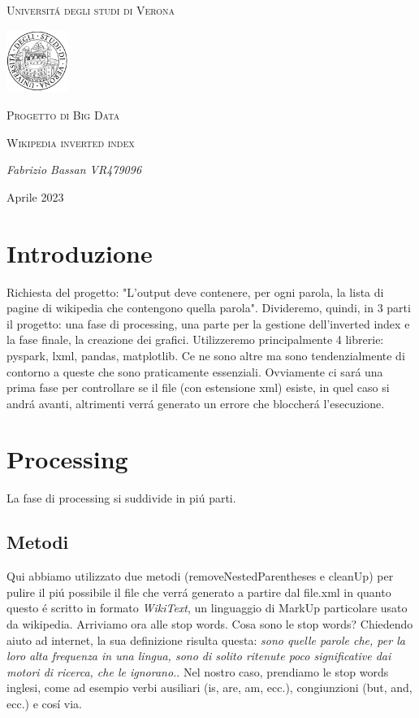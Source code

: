 \documentclass[12pt,a4paper]{article}
\begin{document}
    \begin{titlepage}
    	\centering
        {\textsc{Universitá degli studi di Verona} \par}
        \par\vspace{1cm}
    	\includegraphics[width=0.15\textwidth]{logoUni.png}
        \par
    	\vspace{1cm}
    	{\Large \textsc{Progetto di Big Data}\par}
    	\vspace{1cm}
        {\Large \textsc{Wikipedia inverted index}\par}
    	\vspace{5cm}
    	{\Large\itshape Fabrizio Bassan VR479096\par}
    	\vfill
    	{\large Aprile 2023 \par}
    \end{titlepage}
    
    \tableofcontents
    \newpage
    \section{Introduzione}
    Richiesta del progetto: "L’output deve contenere, per ogni parola, la lista di pagine di wikipedia che contengono quella parola".
    Divideremo, quindi, in 3 parti il progetto: una fase di processing, una parte per la gestione dell'inverted index e la fase finale, la creazione dei grafici.
    Utilizzeremo principalmente 4 librerie: pyspark, lxml, pandas, matplotlib.
    Ce ne sono altre ma sono tendenzialmente di contorno a queste che sono praticamente essenziali.
    \newline
    Ovviamente ci sará una prima fase per controllare se il file (con estensione xml) esiste, in quel caso si andrá avanti, altrimenti verrá generato un errore che bloccherá l'esecuzione.
    \section{Processing}
    La fase di processing si suddivide in piú parti.
    \subsection{Metodi}
    Qui abbiamo utilizzato due metodi (removeNestedParentheses e cleanUp) per pulire il piú possibile il file che verrá generato a partire dal file.xml in quanto questo é scritto in formato \textit{WikiText}, un linguaggio di MarkUp particolare usato da wikipedia. Arriviamo ora alle stop words. Cosa sono le stop words? Chiedendo aiuto ad internet, la sua definizione risulta questa: \textit{sono quelle parole che, per la loro alta frequenza in una lingua, sono di solito ritenute poco significative dai motori di ricerca, che le ignorano.}. Nel nostro caso, prendiamo le stop words inglesi, come ad esempio verbi ausiliari (is, are, am, ecc.), congiunzioni (but, and, ecc.) e cosí via.
\end{document}
